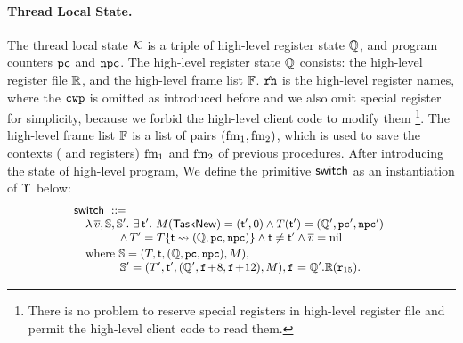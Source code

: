 \paragraph{\textbf{Thread Local State.}}
The thread local state $\mathcal{K}$
is a triple of high-level register state $\mathbb{Q}$,
and program counters $\texttt{pc}$ and $\texttt{npc}$. The high-level
register state $\mathbb{Q}$ consists:
the high-level register file $\mathbb{R}$,
and the high-level frame list $\mathbb{F}$.
$\hat{\texttt{rn}}$ is the high-level register names, where
the $\texttt{cwp}$ is omitted as introduced before and
we also omit special register for simplicity,
because we forbid
the high-level client code to modify them
\footnote{There is no problem to reserve special
registers in high-level register file and permit
the high-level client code to read them.}.
The high-level frame list $\mathbb{F}$ is a list of pairs
$(\text{fm}_1, \text{fm}_2)$, which is used to save
the contexts (\localRN{} and \inRN{} registers)
$\text{fm}_1$ and $\text{fm}_2$ of previous procedures.
After introducing the state of high-level program,
We define the primitive $\mathsf{switch}$ as
an instantiation of $\Upsilon$ below:
\[
    \small\!\!
    \begin{array}{l}
        \primsw \ \define \\
        \quad
        \lambda \, \args{\val}, \hpstate, \hpstate'. \
        \exists \, \thrdid'. \
        \Mem(\TaskNew) = (\thrdid', 0) \land
        \thrdpool(\thrdid') =
            (\hRstate', \pc', \npc') \\
        \qquad\qquad
        \land \,
        \thrdpool' = \thrdpool\{ \thrdid \rightsquigarrow
            (\hRstate, \pc, \npc) \}
            \land \tid \neq \tid' \land \args{\val} = \nil \\
        \\[-9pt]
        \quad \text{where} \
        \hpstate =
            (\thrdpool, \thrdid, (\hRstate, \pc, \npc), \Mem), \\
        \qquad\qquad
        \hpstate' =
            (\thrdpool', \thrdid',
                (\hRstate', \lab{}\!+\!8, \lab{}\!+\!12), \Mem),
                \lab{} = \hRstate'.\hRfile(\reg{15}).
    \end{array}
\]
